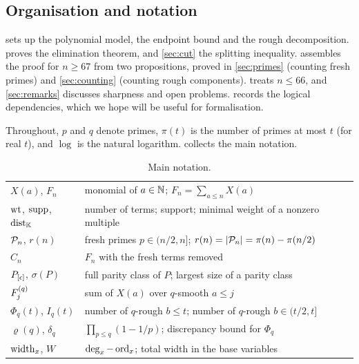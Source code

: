 \subsection{Organisation and notation}
 sets up the polynomial model, the endpoint bound and the rough decomposition.  proves the elimination theorem, and \cref{sec:cut} the splitting inequality.  assembles the proof for $n\ge67$ from two propositions, proved in \cref{sec:primes} (counting fresh primes) and \cref{sec:counting} (counting rough components).  treats $n\le66$, and \cref{sec:remarks} discusses sharpness and open problems.  records the logical dependencies, which we hope will be useful for formalisation.

Throughout, $p$ and $q$ denote primes, $\pi(t)$ is the number of primes at most $t$ (for real $t$), and $\log$ is the natural logarithm.  collects the main notation.

\begin{table}[ht]
\centering\small
\caption{Main notation.}\label{tab:notation}
\begin{tabular}{@{}ll@{}}
\toprule
$X(a)$, $F_n$ & monomial of $a\in\mathbb{N}$; $F_n=\sum_{a\le n}X(a)$\\
$\operatorname{wt}$, $\operatorname{supp}$, $\operatorname{dist}_{\mathbb{K}}$ & number of terms; support; minimal weight of a nonzero multiple\\
$\mathcal{P}_n$, $r(n)$ & fresh primes $p\in(n/2,n]$; $r(n)=|\mathcal{P}_n|=\pi(n)-\pi(n/2)$\\
$C_n$ & $F_n$ with the fresh terms removed\\
$P_{[\epsilon]}$, $\sigma(P)$ & full parity class of $P$; largest size of a parity class\\
$F_{j}^{(q)}$ & sum of $X(a)$ over $q$-smooth $a\le j$\\
$\Phi_q(t)$, $I_q(t)$ & number of $q$-rough $b\le t$; number of $q$-rough $b\in(t/2,t]$\\
$\varrho(q)$, $\delta_q$ & $\prod_{p\le q}(1-1/p)$; discrepancy bound for $\Phi_q$\\
$\operatorname{width}_x$, $W$ & $\deg_x-\operatorname{ord}_x$; total width in the base variables\\
\bottomrule
\end{tabular}
\end{table}
